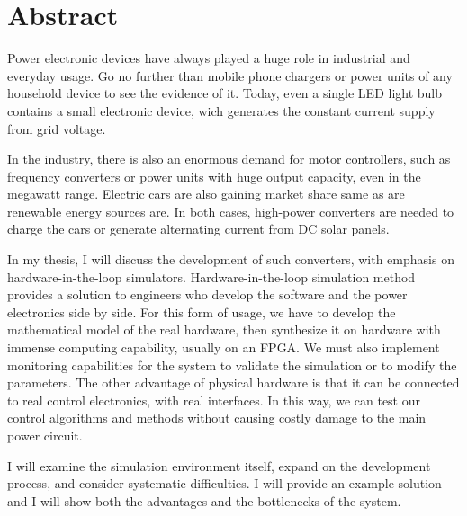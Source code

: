\chapter*{Abstract}

Power electronic devices have always played a huge role in industrial and everyday usage. Go no further than mobile phone chargers or power units of any household device to see the evidence of it. Today, even a single LED light bulb contains a small electronic device, wich generates the constant current supply from grid voltage.
 
In the industry, there is also an enormous demand for motor controllers, such as frequency converters or power units with huge output capacity, even in the megawatt range. Electric cars are also gaining market share same as are renewable energy sources are. In both cases, high-power converters are needed to charge the cars or generate alternating current from DC solar panels.
 
In my thesis, I will discuss the development of such converters, with emphasis on hardware-in-the-loop simulators. Hardware-in-the-loop simulation method provides a solution to engineers who develop the software and the power electronics side by side. For this form of usage, we have to develop the mathematical model of the real hardware, then synthesize it on hardware with immense computing capability, usually on an FPGA. We must also implement monitoring capabilities for the system to validate the simulation or to modify the parameters. The other advantage of physical hardware is that it can be connected to real control electronics, with real interfaces. In this way, we can test our control algorithms and methods without causing costly damage to the main power circuit. 
 
I will examine the simulation environment itself, expand on the development process, and consider systematic difficulties. I will provide an example solution and I will show both the advantages and the bottlenecks of the system.


\vfill
\selectthesislanguage

\setcounter{romanPage}{\value{page}}
